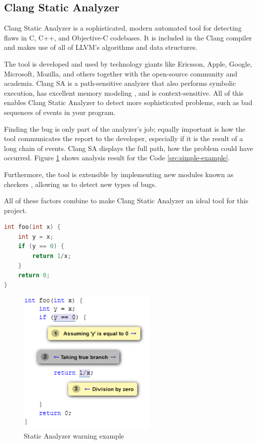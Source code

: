 \subsection{Clang Static Analyzer}
Clang Static Analyzer is a sophisticated, modern automated tool for detecting flaws in C, C++, and Objective-C codebases.
It is included in the Clang compiler and makes use of all of LLVM's algorithms and data structures. 

The tool is developed and used by technology giants like Ericsson, Apple, Google, Microsoft, Mozilla, and others together with the open-source community and academia.
Clang SA is a path-sensitive analyzer that also performs symbolic execution, has excellent memory modeling \cite{memorym}, and is context-sensitive.
All of this enables Clang Static Analyzer to detect more sophisticated problems, such as bad sequences of events in your program.

Finding the bug is only part of the analyzer's job; equally important is how the tool communicates the report to the developer, especially if it is the result of a long chain of events. 
Clang SA displays the full path, how the problem could have occurred. Figure \ref{fig:div-by-zero} shows analysis result for the Code \ref{src:simple-example}.

Furthermore, the tool is extensible by implementing new modules known as checkers \cite{llvm-dev-meeting}, allowing us to detect new types of bugs.

All of these factors combine to make Clang Static Analyzer an ideal tool for this project. 


\begin{lstlisting}[language={C++}]
int foo(int x) {
    int y = x;
    if (y == 0) {
        return 1/x;
    }
    return 0;
}

\end{lstlisting}

\begin{figure}[H]
	\centering
	\includegraphics[width=0.6\textwidth]{images/division_by_zero_report.PNG}
	\caption{Static Analyzer warning example}
	\label{fig:div-by-zero}
\end{figure}

